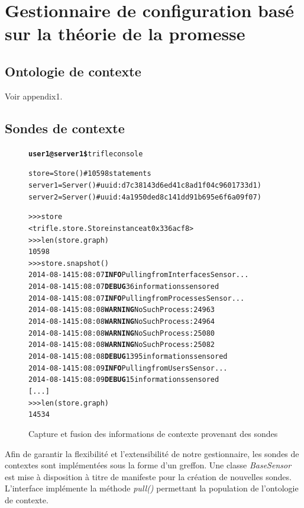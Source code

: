 \section{Gestionnaire de configuration basé sur la théorie de la promesse}

\subsection{Ontologie de contexte}

Voir appendix1.

\subsection{Sondes de contexte}

\begin{figure}
  \begin{alltt}\scriptsize
    \textbf{user1@server1\$} trifle console

    store   = Store()  # 10598 statements
    server1 = Server() # uuid: d7c38143d6ed41c8ad1f04c9601733d1)
    server2 = Server() # uuid: 4a1950ded8c141dd91b695e6f6a09f07)
    
    >>> store
    <trifle.store.Store instance at 0x336acf8>
    >>> len(store.graph)
    10598
    >>> store.snapshot()
    2014-08-14 15:08:07 \textbf{INFO} Pulling from InterfacesSensor...
    2014-08-14 15:08:07 \textbf{DEBUG} 36 informations sensored
    2014-08-14 15:08:07 \textbf{INFO} Pulling from ProcessesSensor...
    2014-08-14 15:08:08 \textbf{WARNING} NoSuchProcess: 24963
    2014-08-14 15:08:08 \textbf{WARNING} NoSuchProcess: 24964
    2014-08-14 15:08:08 \textbf{WARNING} NoSuchProcess: 25080
    2014-08-14 15:08:08 \textbf{WARNING} NoSuchProcess: 25082
    2014-08-14 15:08:08 \textbf{DEBUG} 1395 informations sensored
    2014-08-14 15:08:09 \textbf{INFO} Pulling from UsersSensor...
    2014-08-14 15:08:09 \textbf{DEBUG} 15 informations sensored
    [...]
    >>> len(store.graph)
    14534
  \end{alltt}
  \caption{Capture et fusion des informations de contexte provenant des sondes}
  \label{fig:sensor}
\end{figure}

Afin de garantir la flexibilité et l'extensibilité de notre gestionnaire, les
sondes de contextes sont implémentées sous la forme d'un greffon. Une classe
\emph{BaseSensor} est mise à disposition à titre de manifeste pour la création
de nouvelles sondes. L'interface implémente la méthode \emph{pull()} permettant
la population de l'ontologie de contexte.

